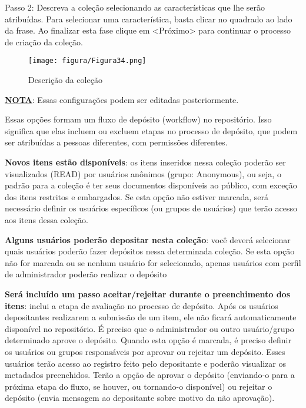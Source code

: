 \documentclass[12pt,hidelinks]{article}
\begin{document}
\newpage
    Passo 2: Descreva a coleção selecionando as características que lhe serão atribuídas. Para selecionar uma característica, basta clicar no quadrado ao lado da frase. Ao finalizar esta fase clique em <Próximo> para continuar o processo de criação da coleção.
    
    \begin{figure}[!htp]
                \centering
                \texttt{[image: figura/Figura34.png]}
                \caption{Descrição da coleção}
            \label{Rotulo}
        \end{figure}
        
    \textbf{\underline{NOTA}}: Essas configurações podem ser editadas posteriormente. 
    
    \singlespacing
    Essas opções formam um fluxo de depósito (workflow) no repositório. Isso significa que elas incluem ou excluem etapas no processo de depósito, que podem ser atribuídas a pessoas diferentes, com permissões diferentes.
    \singlespacing
    
    \textbf{Novos itens estão disponíveis}: os itens inseridos nessa coleção poderão ser visualizados (READ) por usuários anônimos (grupo: Anonymous), ou seja, o padrão para a coleção é ter seus documentos disponíveis ao público, com exceção dos itens restritos e embargados. Se esta opção não estiver marcada, será necessário definir os usuários específicos (ou grupos de usuários) que terão acesso aos itens dessa coleção.
    
    \singlespacing
    
    \textbf{Alguns usuários poderão depositar nesta coleção}: você deverá selecionar quais usuários poderão fazer depósitos nessa determinada coleção. Se esta opção não for marcada ou se nenhum usuário for selecionado, apenas usuários com perfil de administrador poderão realizar o depósito
    
    \singlespacing
    
    \textbf{Será incluído um passo aceitar/rejeitar durante o preenchimento dos itens}: inclui a etapa de avaliação no processo de depósito. Após os usuários depositantes realizarem a submissão de um item, ele não ficará automaticamente disponível no repositório. É preciso que o administrador ou outro usuário/grupo determinado aprove o depósito. Quando esta opção é marcada, é preciso definir os usuários ou grupos responsáveis por aprovar ou rejeitar um depósito. Esses usuários terão acesso ao registro feito pelo depositante e poderão visualizar os metadados preenchidos. Terão a opção de aprovar o depósito (enviando-o para a próxima etapa do fluxo, se houver, ou tornando-o disponível) ou rejeitar o depósito (envia mensagem ao depositante sobre motivo da não aprovação).
    
\end{document}
